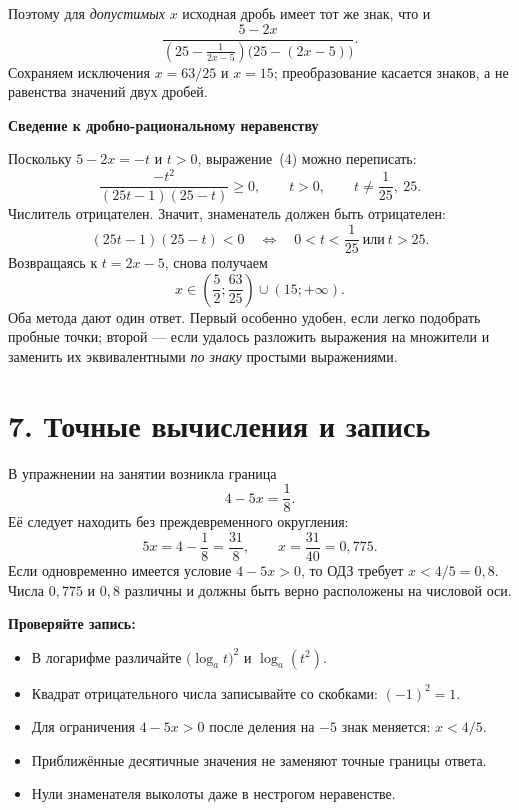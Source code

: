 \documentclass[a4paper,12pt]{article}
\newcommand{\lead}[1]{\textcolor{darkaccent}{\textbf{#1}}}
\newcommand{\work}[1]{\par\vspace{3pt}\textcolor{darkaccent}{\large\bfseries #1}\par\vspace{3pt}}
\begin{document}
Поэтому для \emph{допустимых} $x$ исходная дробь имеет тот же знак, что и
\[
\frac{5-2x}{\displaystyle\left(25-\frac1{2x-5}\right)
\bigl(25-(2x-5)\bigr)}.
\tag{4}
\]
Сохраняем исключения $x=63/25$ и $x=15$; преобразование касается знаков, а не равенства значений двух дробей.

\work{Сведение к дробно-рациональному неравенству}
Поскольку $5-2x=-t$ и $t>0$, выражение~(4) можно переписать:
\[
\frac{-t^2}{(25t-1)(25-t)}\ge0,\qquad t>0,
\qquad t\ne\frac1{25},\ 25.
\]
Числитель отрицателен. Значит, знаменатель должен быть отрицателен:
\[
(25t-1)(25-t)<0
\quad\Longleftrightarrow\quad
0<t<\frac1{25}\ \text{или}\ t>25.
\]
Возвращаясь к $t=2x-5$, снова получаем
\[
\boxed{\displaystyle x\in\left(\frac52;\frac{63}{25}\right)\cup(15;+\infty)}.
\]
Оба метода дают один ответ. Первый особенно удобен, если легко подобрать пробные точки; второй --- если удалось разложить выражения на множители и заменить их эквивалентными \emph{по знаку} простыми выражениями.

\section*{7. Точные вычисления и запись}
В упражнении на занятии возникла граница
\[
4-5x=\frac18.
\]
Её следует находить без преждевременного округления:
\[
5x=4-\frac18=\frac{31}{8},\qquad
\boxed{x=\frac{31}{40}=0{,}775}.
\]
Если одновременно имеется условие $4-5x>0$, то ОДЗ требует $x<4/5=0{,}8$. Числа $0{,}775$ и $0{,}8$ различны и должны быть верно расположены на числовой оси.

\lead{Проверяйте запись:}
\begin{itemize}
\item В логарифме различайте $\bigl(\log_a t\bigr)^2$ и $\log_a(t^2)$.
\item Квадрат отрицательного числа записывайте со скобками: $(-1)^2=1$.
\item Для ограничения $4-5x>0$ после деления на $-5$ знак меняется: $x<4/5$.
\item Приближённые десятичные значения не заменяют точные границы ответа.
\item Нули знаменателя выколоты даже в нестрогом неравенстве.
\end{itemize}
\end{document}
